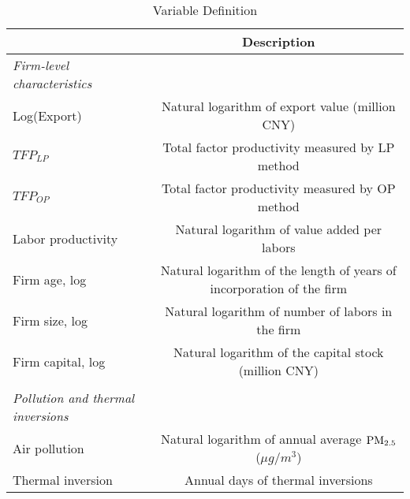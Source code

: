 \documentclass[12pt]{article}
\begin{document}
\begin{table}[H]\centering
  \caption{Variable Definition}\label{tab:var_definition}
  \resizebox{\textwidth}{!}
  {
  \begin{tabular}{l*{1}{c}}
    \hline\hline
    &\multicolumn{1}{c}{Description}\\    
    \hline
    \textit{Firm-level characteristics} \\
    Log(Export)	& Natural logarithm of export value (million CNY) \\
    $TFP_{LP}$	&Total factor productivity measured by LP method \\
    $TFP_{OP}$	&Total factor productivity measured by OP method \\
    Labor productivity & Natural logarithm of value added per labors \\
    Firm age, log 	& Natural logarithm of the length of years of incorporation of the firm\\
    Firm size, log	& Natural logarithm of number of labors in the firm \\
    Firm capital, log	& Natural logarithm of the capital stock (million CNY) \\
                       &\\
    \textit{Pollution and thermal inversions} &\\    
    Air pollution     &Natural logarithm of annual average $\rm PM_{2.5}$ ($\mu g/m^3$) \\
    Thermal inversion	&Annual days of thermal inversions\\
    \hline\hline
  \end{tabular}
  }
\end{table}
\end{document}
